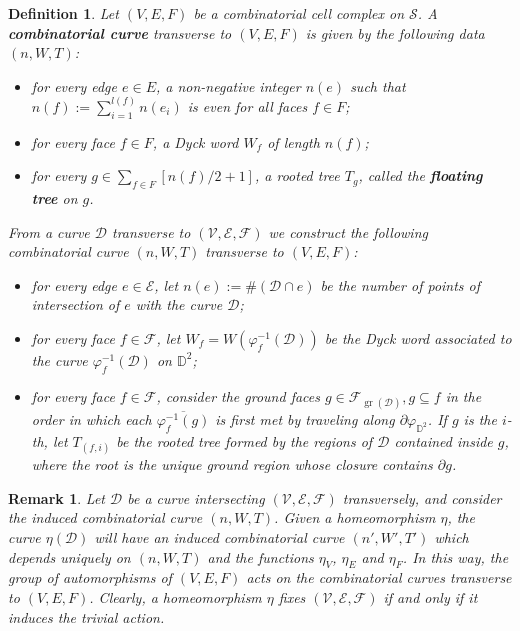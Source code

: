 \documentclass[10pt,a4paper]{amsart}
\newtheorem{definition}{Definition}
\newtheorem{remark}{Remark}
\newcommand*{\bbD}{\mathbb{D}}
\newcommand*{\calD}{\mathcal{D}}
\newcommand*{\calE}{\mathcal{E}}
\newcommand*{\calF}{\mathcal{F}}
\newcommand*{\calS}{\mathcal{S}}
\newcommand*{\calV}{\mathcal{V}}
\DeclareMathOperator{\gr}{gr}
\begin{document}
\begin{definition}\label{def:combcurve}
    Let $(V,E,F)$ be a combinatorial cell complex on $\calS$. A \textbf{combinatorial curve} transverse to $(V,E,F)$ is given by the following data $(n,W,T)$:
    \begin{itemize}
        \item for every edge $e\in E$, a non-negative integer $n(e)$ such that $n(f):=\sum_{i=1}^{l(f)}n(e_i)$ is even for all faces $f\in F$;
        \item for every face $f\in F$, a Dyck word $W_f$ of length $n(f)$;
        \item for every $g\in\sum_{f\in F}[n(f)/2+1]$, a rooted tree $T_g$, called the \textbf{floating tree} on $g$.
    \end{itemize}

    From a curve $\calD$ transverse to $(\calV,\calE,\calF)$ we construct the following combinatorial curve $(n,W,T)$ transverse to $(V,E,F)$:
    \begin{itemize}
        \item for every edge $e\in\calE$, let $n(e):=\#(\calD\cap e)$ be the number of points of intersection of $e$ with the curve $\calD$;
        \item for every face $f\in\calF$, let $W_f=W(\varphi_f^{-1}(\calD))$ be the Dyck word associated to the curve $\varphi_f^{-1}(\calD)$ on $\bbD^2$;
        \item for every face $f\in\calF$, consider the ground faces $g\in\calF_{\gr(\calD)},g\subseteq f$ in the order in which each $\overline{\varphi_f^{-1}(g)}$ is first met by traveling along $\partial\varphi_{\bbD^2}$. If $g$ is the $i$-th, let $T_{(f,i)}$ be the rooted tree formed by the regions of $\calD$ contained inside $g$, where the root is the unique ground region whose closure contains $\partial g$.
    \end{itemize}  
\end{definition}

\begin{remark}\label{rem:act}
    Let $\calD$ be a curve intersecting $(\calV,\calE,\calF)$ transversely, and consider the induced combinatorial curve $(n,W,T)$. Given a homeomorphism $\eta$, the curve $\eta(\calD)$ will have an induced combinatorial curve $(n',W',T')$ which depends uniquely on $(n,W,T)$ and the functions $\eta_V$, $\eta_E$ and $\eta_F$. In this way, the group of automorphisms of $(V,E,F)$ acts on the combinatorial curves transverse to $(V,E,F)$. Clearly, a homeomorphism $\eta$ fixes $(\calV,\calE,\calF)$ if and only if it induces the trivial action.
\end{remark}
\end{document}
